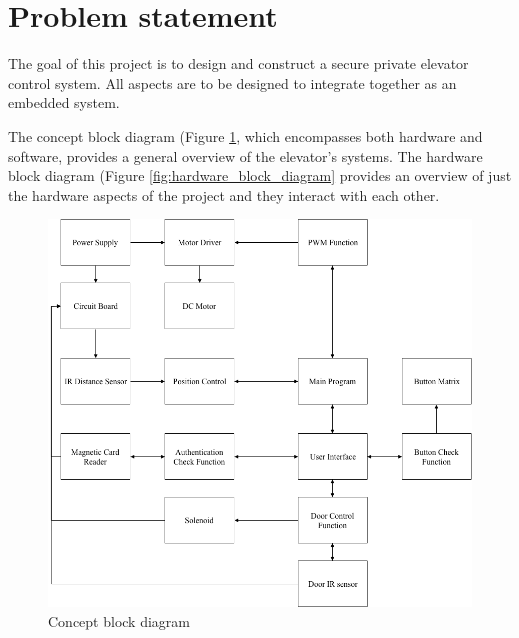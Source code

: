 \documentclass{article}
\begin{document}
	\section{Problem statement}
	The goal of this project is to design and construct a secure private elevator control system. All aspects are to be designed to integrate together as an embedded system. 
	
	The concept block diagram (Figure \ref{fig:concept_block_diagram}, which encompasses both hardware and software, provides a general overview of the elevator's systems. The hardware block diagram (Figure \ref{fig:hardware_block_diagram} provides an overview of just the hardware aspects of the project and they interact with each other.
	
	\begin{figure}[h!]
		\includegraphics[width=\linewidth]{cbd.png}
		\caption{Concept block diagram}
		\label{fig:concept_block_diagram}
	\end{figure}
	
\end{document}
